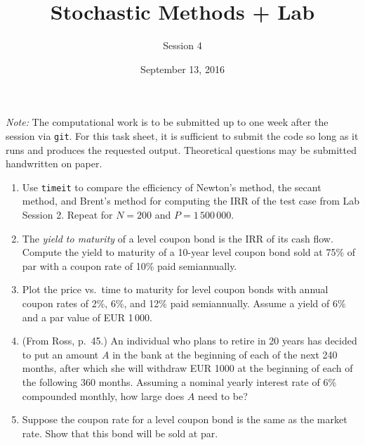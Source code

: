 \documentclass[12pt]{article}
\begin{document}
\title{Stochastic Methods + Lab}
\author{Session 4}
\date{September 13, 2016}
\maketitle

\noindent\emph{Note:} The computational work is to be submitted up to
one week after the session via \texttt{git}.  For this task sheet, it
is sufficient to submit the code so long as it runs and produces the
requested output.  Theoretical questions may be submitted handwritten
on paper.

\begin{enumerate}


\item Use \texttt{timeit} to compare the efficiency of Newton's
method, the secant method, and Brent's method for computing the IRR of
the test case from Lab Session 2. Repeat for $N=200$ and
$P=1\,500\,000$.

\item The \emph{yield to maturity} of a level coupon bond is the IRR
of its cash flow.  Compute the yield to maturity of a 10-year level
coupon bond sold at 75\% of par with a coupon rate of 10\% paid
semiannually.

\item Plot the price vs.\ time to maturity for level coupon bonds with
annual coupon rates of 2\%, 6\%, and 12\% paid semiannually.  Assume a
yield of 6\% and a par value of EUR 1\,000.


\item (From Ross, p.\ 45.) An individual who plans to retire in 20
years has decided to put an amount $A$ in the bank at the beginning of
each of the next 240 months, after which she will withdraw EUR 1000
at the beginning of each of the following 360 months.  Assuming a
nominal yearly interest rate of 6\% compounded monthly, how large does
$A$ need to be?

\item Suppose the coupon rate for a level coupon bond is the same as
the market rate.  Show that this bond will be sold at par.


\end{enumerate}
\end{document}
